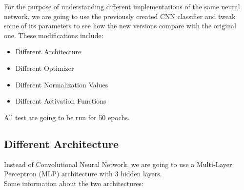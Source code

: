 For the purpose of understanding different implementations of the same neural network,
we are going to use the previously created CNN classifier and tweak some of its parameters 
to see how the new versions compare with the original one. These modifications include:
\begin{itemize}
    \item Different Architecture
    \item Different Optimizer
    \item Different Normalization Values
    \item Different Activation Functions
\end{itemize}
All test are going to be run for 50 epochs.

\subsection{Different Architecture}
Instead of Convolutional Neural Network, we are going to use a Multi-Layer Perceptron (MLP)
architecture with 3 hidden layers.\\ 
Some information about the two architectures:
